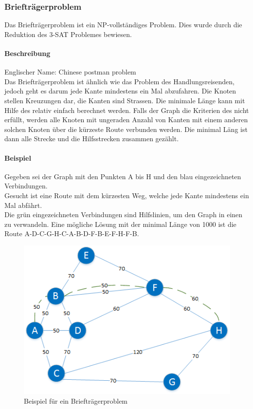 	\subsubsection{Briefträgerproblem}\label{chinese_postman}
	Das Briefträgerproblem ist ein NP-vollständiges Problem. Dies wurde durch die Reduktion des 3-SAT Problemes bewiesen.

	\paragraph{Beschreibung}
	Englischer Name: Chinese postman problem\\
	Das Briefträgerproblem ist ähnlich wie das Problem des Handlungsreisenden, jedoch geht es darum jede Kante mindestens ein Mal abzufahren. Die Knoten stellen Kreuzungen dar, die Kanten sind Strassen. Die minimale Länge kann mit Hilfe des  relativ einfach berechnet werden. Falls der Graph die Kriterien des  nicht erfüllt, werden alle Knoten mit ungeraden Anzahl von Kanten mit einem anderen solchen Knoten über die kürzeste Route verbunden werden. Die minimal Läng ist dann alle Strecke und die Hilfsstrecken zusammen gezählt.
	\cite{pearson2004decision}

	\paragraph{Beispiel} Gegeben sei der Graph mit den Punkten A bis H und den blau eingezeichneten Verbindungen.\\
Gesucht ist eine Route mit dem kürzesten Weg, welche jede Kante mindestens ein Mal abfährt. \cite{pearson2004decision}\\
Die grün eingezeichneten Verbindungen sind Hilfslinien, um den Graph in einen  zu verwandeln. Eine mögliche Lösung mit der minimal Länge von 1000 ist die Route A-D-C-G-H-C-A-B-D-F-B-E-F-H-F-B.
\begin{figure}[h]
\centering
\includegraphics[scale=0.8]{images/visio/chinese_postman.png}
\caption{Beispiel für ein Briefträgerproblem}
\label{fig:chinese_postman_example}
\end{figure}

